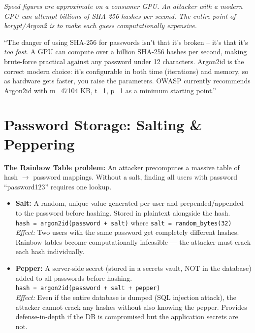 \documentclass[11pt, letterpaper]{article}
\newcommand{\talkingpoint}[1]{%
  \begin{tcolorbox}[colback=talkbg, colframe=talkborder,
    title={\bfseries Interview Talking Point}, arc=3pt, boxrule=1pt]
  #1
  \end{tcolorbox}%
}
\begin{document}
\vspace{4pt}
\textit{Speed figures are approximate on a consumer GPU. An attacker with a modern GPU can attempt billions of SHA-256 hashes per second. The entire point of bcrypt/Argon2 is to make each guess computationally expensive.}

\talkingpoint{``The danger of using SHA-256 for passwords isn't that it's broken -- it's that it's \emph{too fast}. A GPU can compute over a billion SHA-256 hashes per second, making brute-force practical against any password under 12 characters. Argon2id is the correct modern choice: it's configurable in both time (iterations) and memory, so as hardware gets faster, you raise the parameters. OWASP currently recommends Argon2id with m=47104 KB, t=1, p=1 as a minimum starting point.''}

\section*{Password Storage: Salting \& Peppering}

\textbf{The Rainbow Table problem:} An attacker precomputes a massive table of hash $\to$ password mappings. Without a salt, finding all users with password ``password123'' requires one lookup.

\begin{itemize}[noitemsep]
  \item \textbf{Salt:} A random, unique value generated per user and prepended/appended to the password before hashing. Stored in plaintext alongside the hash.\\
  \texttt{hash = argon2id(password + salt)} where \texttt{salt = random\_bytes(32)}\\
  \textit{Effect:} Two users with the same password get completely different hashes. Rainbow tables become computationally infeasible --- the attacker must crack each hash individually.

  \item \textbf{Pepper:} A server-side secret (stored in a secrets vault, NOT in the database) added to all passwords before hashing.\\
  \texttt{hash = argon2id(password + salt + pepper)}\\
  \textit{Effect:} Even if the entire database is dumped (SQL injection attack), the attacker cannot crack any hashes without also knowing the pepper. Provides defense-in-depth if the DB is compromised but the application secrets are not.
\end{itemize}
\end{document}
